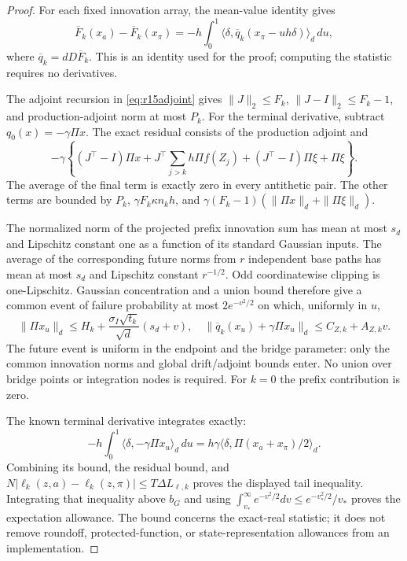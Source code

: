 \begin{proof}
For each fixed innovation array, the mean-value identity gives
\[
 \overline F_k(x_a)-\overline F_k(x_\pi)
       =-h\int_0^1\langle\delta,
               \overline q_k(x_\pi-uh\delta)\rangle_d\,du,
\]
where $\overline q_k=dD\overline F_k$. This is an identity used for the
proof; computing the statistic requires no derivatives.

The adjoint recursion in \eqref{eq:r15adjoint} gives
$\|J\|_2\leq F_k$, $\|J-I\|_2\leq F_k-1$, and production-adjoint
norm at most $P_k$. For the terminal derivative, subtract
$q_0(x)=-\gamma\Pi x$. The exact residual consists of the production
adjoint and
\[
 -\gamma\left\{(J^\top-I)\Pi x
       +J^\top\sum_{j>k}h\Pi f(Z_j)
       +(J^\top-I)\Pi\xi+\Pi\xi\right\}.
\]
The average of the final term is exactly zero in every antithetic pair.
The other terms are bounded by $P_k$, $\gamma F_k\kappa n_kh$, and
$\gamma(F_k-1)(\|\Pi x\|_d+\|\Pi\xi\|_d)$.

The normalized norm of the projected prefix innovation sum has mean
at most $s_d$ and Lipschitz constant one as a function of its standard
Gaussian inputs. The average of the corresponding future norms from
$r$ independent base paths has mean at most $s_d$ and Lipschitz constant
$r^{-1/2}$. Odd coordinatewise clipping is one-Lipschitz. Gaussian
concentration and a union bound therefore give a common event of failure
probability at most $2e^{-v^2/2}$ on which, uniformly in $u$,
\[
 \|\Pi x_u\|_d\leq H_k+
               \frac{\sigma_I\sqrt{t_k}}{\sqrt d}(s_d+v),
 \quad
 \|\overline q_k(x_u)+\gamma\Pi x_u\|_d
                                      \leq C_{Z,k}+A_{Z,k}v.
\]
The future event is uniform in the endpoint and the bridge parameter:
only the common innovation norms and global drift/adjoint bounds enter.
No union over bridge points or integration nodes is required. For $k=0$
the prefix contribution is zero.

The known terminal derivative integrates exactly:
\[
 -h\int_0^1\langle\delta,-\gamma\Pi x_u\rangle_d\,du
       =h\gamma\langle\delta,\Pi(x_a+x_\pi)/2\rangle_d.
\]
Combining its bound, the residual bound, and
$N|\ell_k(z,a)-\ell_k(z,\pi)|\leq T\Delta L_{\ell,k}$
proves the displayed tail inequality. Integrating that inequality above
$b_G$ and using
$\int_{v_*}^{\infty}e^{-v^2/2}dv\leq e^{-v_*^2/2}/v_*$ proves
the expectation allowance. The bound concerns the exact-real statistic;
it does not remove roundoff, protected-function, or state-representation
allowances from an implementation.
\end{proof}

